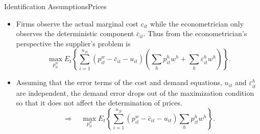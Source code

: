 \documentclass{beamer}
\begin{document}
\begin{frame}{Identification Assumptions}{Prices}
	\begin{itemize}
		\item Firms observe the actual marginal cost $c_{it}$ while the econometrician only observes the deterministic component $\bar{c}_{it}$. Thus from the econometrician's perspective the supplier's problem is
		\begin{equation}
			\max_{p^w_{it}} E_t\left\{\sum_{i=1}^{n_{ft}}(p_{it}^w-\bar{c}_{it}-u_{it})\left(\sum_h p_{it}^hw^h+\sum_h\varepsilon_{it}^hw^h\right) \right\}.
		\end{equation}
		\item Assuming that the error terms of the cost and demand equations, $u_{it}$ and $\varepsilon_{it}^h$ are independent, the demand error drops out of the maximization condition so that it does not affect the determination of prices.
		\begin{equation}
			\Rightarrow\quad \max_{p^w_{it}} E_t\left\{\sum_{i=1}^{n_{ft}}(p_{it}^w-\bar{c}_{it}-u_{it})\sum_h p_{it}^hw^h \right\}.
		\end{equation}
	\end{itemize}
\end{frame}

\end{document}
